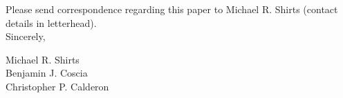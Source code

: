 \documentclass[fontsize=11pt]{article}
\begin{document}
		
		
		
		
		
%		
%		
	
	Please send correspondence regarding this paper to Michael R. Shirts (contact
	details in letterhead).\\	
	
	\noindent Sincerely,
	
	\noindent Michael R. Shirts \\
	\noindent Benjamin J. Coscia \\
	\noindent Christopher P. Calderon \\
	
\end{document}
